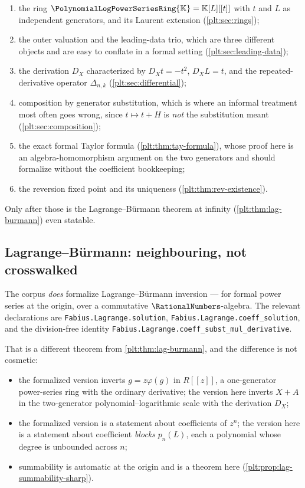 \documentclass[11pt,oneside]{article}
\theoremstyle{plain}
\theoremstyle{definition}
\theoremstyle{remark}
\newcommand{\K}{\mathbb{K}}
\newcommand{\PLpow}{\PolynomialLogPowerSeriesRing{\K}}   %
\newcommand{\DX}{D_{X}}                                  %
\newcommand{\shiftop}[2]{\Delta_{#1,#2}}                 %
\begin{document}
\begin{enumerate}
\item the ring \(\PLpow=\K[L][[t]]\) with \(t\) and \(L\) as independent
  generators, and its Laurent extension (\cref{plt:sec:rings});
\item the outer valuation and the leading-data trio, which are three different
  objects and are easy to conflate in a formal setting
  (\cref{plt:sec:leading-data});
\item the derivation \(\DX\) characterized by \(\DX t=-t^{2}\),
  \(\DX L=t\), and the repeated-derivative operator \(\shiftop{n}{k}\)
  (\cref{plt:sec:differential});
\item composition by generator substitution, which is where an informal
  treatment most often goes wrong, since \(t\mapsto t+H\) is \emph{not} the
  substitution meant (\cref{plt:sec:composition});
\item the exact formal Taylor formula (\cref{plt:thm:tay-formula}), whose proof
  here is an algebra-homomorphism argument on the two generators and should
  formalize without the coefficient bookkeeping;
\item the reversion fixed point and its uniqueness
  (\cref{plt:thm:rev-existence}).
\end{enumerate}

Only after those is the Lagrange--B\"urmann theorem at infinity
(\cref{plt:thm:lag-burmann}) even statable.

\subsection{Lagrange--B\"urmann: neighbouring, not crosswalked}

The corpus \emph{does} formalize Lagrange--B\"urmann inversion --- for formal
power series at the origin, over a commutative \(\RationalNumbers\)-algebra.
The relevant declarations are \texttt{Fabius.Lagrange.solution},
\texttt{Fabius.Lagrange.coeff\_solution}, and the division-free identity
\texttt{Fabius.Lagrange.coeff\_subst\_mul\_derivative}.

That is a different theorem from \cref{plt:thm:lag-burmann}, and the difference
is not cosmetic:

\begin{itemize}
\item the formalized version inverts \(g=z\varphi(g)\) in \(R[[z]]\), a
  one-generator power-series ring with the ordinary derivative; the version
  here inverts \(X+A\) in the two-generator polynomial--logarithmic scale with
  the derivation \(\DX\);
\item the formalized version is a statement about coefficients of \(z^{n}\);
  the version here is a statement about coefficient \emph{blocks}
  \(p_{n}(L)\), each a polynomial whose degree is unbounded across \(n\);
\item summability is automatic at the origin and is a theorem here
  (\cref{plt:prop:lag-summability-sharp}).
\end{itemize}
\end{document}
